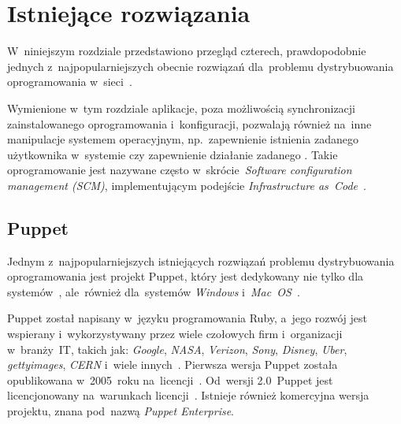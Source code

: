 \documentclass[thesis]{subfiles}
\begin{document}

\section{Istniejące rozwiązania}
\label{sec:istniejace-rozwiazania}

W~niniejszym rozdziale przedstawiono przegląd czterech, prawdopodobnie jednych z~najpopularniejszych obecnie rozwiązań dla~problemu dystrybuowania oprogramowania w~sieci~\cite{leading-scms,wiki:scm-comparison}.

Wymienione w~tym rozdziale aplikacje, poza możliwością synchronizacji zainstalowanego oprogramowania i~konfiguracji, pozwalają również na~inne manipulacje systemem operacyjnym, np.~zapewnienie istnienia zadanego użytkownika w~systemie czy zapewnienie działanie zadanego . Takie oprogramowanie jest nazywane często w~skrócie~\emph{Software configuration management (SCM)}, implementującym podejście \emph{Infrastructure as~Code}~\cite{wiki:iac,wiki:scm}.


\subsection{Puppet}

Jednym z~najpopularniejszych istniejących rozwiązań problemu dystrybuowania oprogramowania jest projekt Puppet, który jest dedykowany nie tylko dla systemów~, ale~również dla~systemów \emph{Windows} i~\emph{Mac~OS}~\cite{puppet,puppet-github,puppet-clients}.

Puppet został napisany w~języku programowania Ruby, a~jego rozwój jest wspierany i~wykorzystywany przez wiele czołowych firm i~organizacji w~branży~IT, takich jak: \emph{Google}, \emph{NASA}, \emph{Verizon}, \emph{Sony}, \emph{Disney}, \emph{Uber}, \emph{gettyimages}, \emph{CERN} i~wiele innych~\cite{puppet,puppet-google,puppet-cern,puppet-chef-disney}. Pierwsza wersja Puppet została opublikowana w~2005~roku na~licencji~. Od~wersji 2.0~Puppet jest licencjonowany na~warunkach licencji~. Istnieje również komercyjna wersja projektu, znana pod~nazwą \emph{Puppet Enterprise}.
\end{document}
